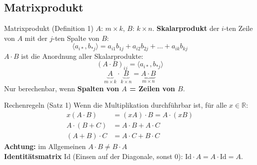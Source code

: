 \documentclass[a4paper, fontsize=7pt]{scrartcl}
\def\R{\mathbb{R}}  %
\begin{document}
\subsection{Matrixprodukt}

\begin{mainbox}{Matrixprodukt (Definition 1)}
$A$: $m \times k$, $B$: $k \times n$. \textbf{Skalarprodukt} der $i$-ten Zeile von
$A$ mit der $j$-ten Spalte von $B$:
$$\langle a_{i*}, b_{*j} \rangle = a_{i1} b_{1j} + a_{i2} b_{2j} + \ldots
+ a_{ik} b_{kj}$$
$A \cdot B$ ist die Anordnung aller Skalarprodukte:
$$\boxed{(A \cdot B)_{ij} = \langle a_{i*}, b_{*j} \rangle}$$
$$\underbrace{A}_{m \times k} \cdot \underbrace{B}_{k \times n}
= \underbrace{A \cdot B}_{m \times n}$$
Nur berechenbar, wenn \textbf{Spalten von $A$ = Zeilen von $B$}.
\end{mainbox}

\begin{mainbox}{Rechenregeln (Satz 1)}
Wenn die Multiplikation durchführbar ist, für alle $x \in \R$:
\begin{align*}
x(A \cdot B) &= (xA) \cdot B = A \cdot (xB)\\
A \cdot (B + C) &= A \cdot B + A \cdot C\\
(A + B) \cdot C &= A \cdot C + B \cdot C
\end{align*}
\textbf{Achtung:} im Allgemeinen $\boxed{A \cdot B \neq B \cdot A}$\\
\textbf{Identitätsmatrix} Id (Einsen auf der Diagonale, sonst 0):
$\text{Id} \cdot A = A \cdot \text{Id} = A$.
\end{mainbox}
\end{document}
